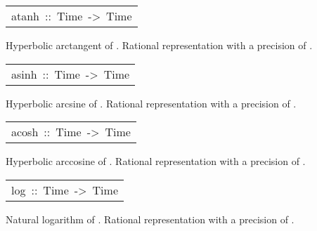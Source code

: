 \begin{haddockdesc}
\item[\begin{tabular}{@{}l}
atanh\ ::\ Time\ ->\ Time
\end{tabular}]\haddockbegindoc
Hyperbolic arctangent of . Rational representation with a
 precision of .\par

\end{haddockdesc}
\begin{haddockdesc}
\item[\begin{tabular}{@{}l}
asinh\ ::\ Time\ ->\ Time
\end{tabular}]\haddockbegindoc
Hyperbolic arcsine of . Rational representation with a
 precision of .\par

\end{haddockdesc}
\begin{haddockdesc}
\item[\begin{tabular}{@{}l}
acosh\ ::\ Time\ ->\ Time
\end{tabular}]\haddockbegindoc
Hyperbolic arccosine of . Rational representation with a
 precision of .\par

\end{haddockdesc}
\begin{haddockdesc}
\item[\begin{tabular}{@{}l}
log\ ::\ Time\ ->\ Time
\end{tabular}]\haddockbegindoc
Natural logarithm of . Rational representation with a
 precision of .\par

\end{haddockdesc}
